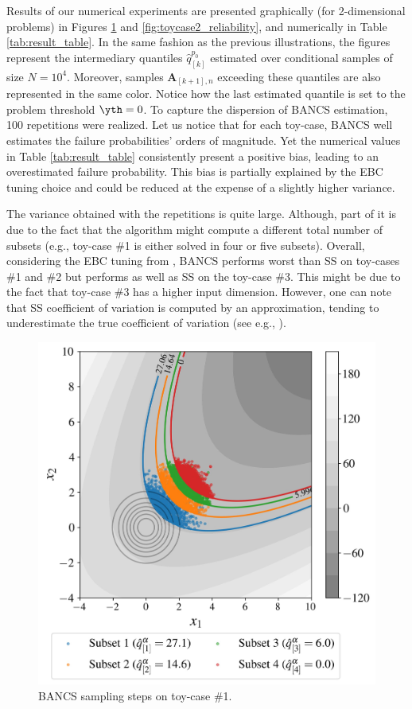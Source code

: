 Results of our numerical experiments are presented graphically (for 2-dimensional problems) in Figures  \ref{fig:toycase1_reliability} and \ref{fig:toycase2_reliability}, and numerically in Table \ref{tab:result_table}. 
In the same fashion as the previous illustrations, the figures represent the intermediary quantiles $\widehat{q}_{[k]}^{p_0}$ estimated over conditional samples of size $N=10^4$. 
Moreover, samples $\mathbf{A}_{[k+1], n}$ exceeding these quantiles are also represented in the same color. 
Notice how the last estimated quantile is set to the problem threshold $\yth = 0$. 
To capture the dispersion of BANCS estimation, 100 repetitions were realized. 
Let us notice that for each toy-case, BANCS well estimates the failure probabilities' orders of magnitude. 
Yet the numerical values in Table \ref{tab:result_table} consistently present a positive bias, leading to an overestimated failure probability. 
This bias is partially explained by the EBC tuning choice and could be reduced at the expense of a slightly higher variance.

The variance obtained with the repetitions is quite large. 
Although, part of it is due to the fact that the algorithm might compute a different total number of subsets (e.g., toy-case \#1 is either solved in four or five subsets). 
Overall, considering the EBC tuning from , BANCS performs worst than SS on toy-cases \#1 and \#2 but performs as well as SS on the toy-case \#3. 
This might be due to the fact that toy-case \#3 has a higher input dimension. 
However, one can note that SS coefficient of variation is computed by an approximation, tending to underestimate the true coefficient of variation (see e.g., \cite{Papaioannou_PEM_2015}). 

\begin{figure}
    \centering
    \includegraphics[width=0.6\linewidth]{part3/figures/BANCS/bancs_parabolic2.jpg}
    \caption{BANCS sampling steps on toy-case \#1.}
    \label{fig:toycase1_reliability}
\end{figure}

